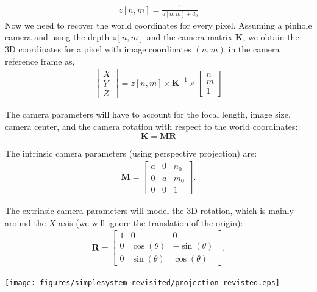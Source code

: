 \begin{align}
z \left[n,m \right] = \frac{1}{ d \left[n,m \right] + d_0}
\end{align}
Now we need to recover the world coordinates for every pixel. 
Assuming a pinhole camera and using the depth $z \left[n,m \right]$ and the camera matrix $\mathbf{K}$, we obtain the 3D coordinates for a pixel with image coordinates $(n,m)$ in the camera reference frame as,
\begin{align}
\begin{bmatrix}
X \\
Y \\ 
Z 
\end{bmatrix}
= z\left[n,m \right] \times \mathbf{K}^{-1} \times
\begin{bmatrix}
n \\
m \\ 
1 
\end{bmatrix}
\label{eq:recoverworldcoord}
\end{align}


The camera parameters will have to account for the focal length, image size, camera center, and the camera rotation  with respect to the world coordinates:
\begin{equation}
\mathbf{K} = \mathbf{M} \mathbf{R}
\end{equation}


The intrinsic camera parameters (using perspective projection) are:
\begin{align}
\mathbf{M}
= 
\begin{bmatrix}
a & 0 & n_0\\
0 & a & m_0 \\ 
0 & 0 & 1 
\end{bmatrix}.
\end{align}


The extrinsic camera parameters will model the 3D rotation, which is mainly around the $X$-axis (we will ignore the translation of the origin):
\begin{align}
\mathbf{R}
= 
\begin{bmatrix}
1 & 0 & 0\\
0 & \cos(\theta) & -\sin(\theta) \\ 
0 & \sin(\theta) & \cos(\theta) 
\end{bmatrix}.
\end{align}

\centerline{
\texttt{[image: figures/simplesystem\_revisited/projection-revisted.eps]}
} 


